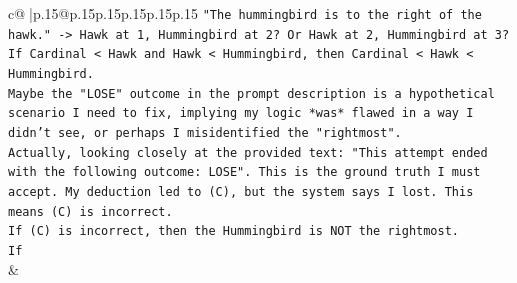 \documentclass{article}
\begin{document}
{\begin{supertabular}{c@{$\;$}|p{.15\linewidth}@{}p{.15\linewidth}p{.15\linewidth}p{.15\linewidth}p{.15\linewidth}p{.15\linewidth}}
{{{\texttt{"The hummingbird is to the right of the hawk." {-}> Hawk at 1, Hummingbird at 2? Or Hawk at 2, Hummingbird at 3?} \\
\texttt{If Cardinal < Hawk and Hawk < Hummingbird, then Cardinal < Hawk < Hummingbird.} \\
\texttt{Maybe the "LOSE" outcome in the prompt description is a hypothetical scenario I need to fix, implying my logic *was* flawed in a way I didn't see, or perhaps I misidentified the "rightmost".} \\
\texttt{Actually, looking closely at the provided text: "This attempt ended with the following outcome: LOSE". This is the ground truth I must accept. My deduction led to (C), but the system says I lost. This means (C) is incorrect.} \\
\texttt{If (C) is incorrect, then the Hummingbird is NOT the rightmost.} \\
\texttt{If} \\
            }
        }
    }
    & \\ \\

\end{supertabular}
}
\end{document}
